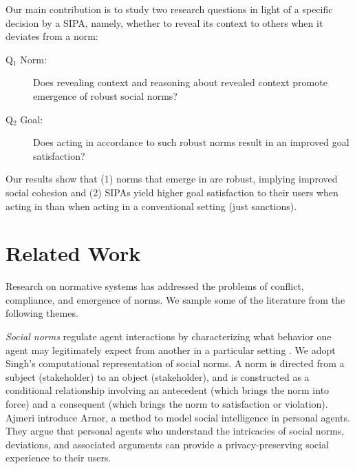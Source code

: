 %
Our main contribution is to study two research questions in light of a specific decision by a SIPA, namely, whether to reveal its context to others when it deviates from a norm:

\begin{description}
\item[Q$_1$ Norm:] Does revealing context and reasoning about revealed context promote emergence of robust social norms? 
\item[Q$_2$ Goal:] Does acting in accordance to such robust norms result in an improved goal satisfaction?
\end{description}

Our results show that (1) norms that emerge in \frameworkB are robust, implying improved social cohesion and (2) SIPAs yield higher goal satisfaction to their users when acting in \frameworkB than when acting in a conventional setting (just sanctions). 

\section{Related Work}
\label{sec:Poros-related-work}

Research on normative systems has addressed the problems of conflict, 
compliance, and emergence of norms. We sample some of the literature from the following themes.

\emph{Social norms} regulate agent interactions by characterizing
what behavior one agent may legitimately expect from another in a particular 
setting \citep{Kafali-IS16-Revani,Singh-2013-Norms}. 
%
We adopt Singh's  computational representation 
of social norms. A norm is directed from a subject (stakeholder) to an 
object (stakeholder), and is constructed
as a conditional relationship involving an antecedent (which brings the
norm into force) and a consequent (which brings the norm to satisfaction
or violation). 
Ajmeri {\etal}  
introduce Arnor, a method to model social intelligence in personal agents. 
They argue that personal agents who understand 
the intricacies of social norms, deviations, and associated arguments can 
provide a privacy-preserving social experience to their users. 

